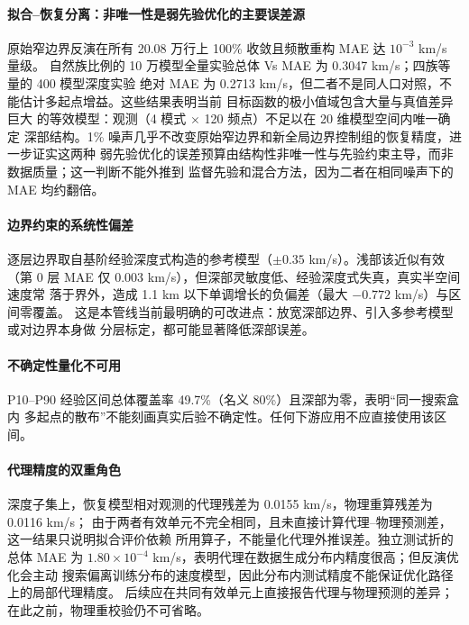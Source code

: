 \documentclass[UTF8,a4paper,11pt]{ctexart}
\begin{document}
\paragraph{拟合--恢复分离：非唯一性是弱先验优化的主要误差源}
原始窄边界反演在所有 20.08 万行上 100\% 收敛且频散重构 MAE 达 \(10^{-3}\) km/s 量级。
自然族比例的 10 万模型全量实验总体 Vs MAE 为 0.3047 km/s；四族等量的 400 模型深度实验
绝对 MAE 为 0.2713 km/s，但二者不是同人口对照，不能估计多起点增益。这些结果表明当前
目标函数的极小值域包含大量与真值差异巨大
的等效模型：观测（4 模式 \(\times\) 120 频点）不足以在 20 维模型空间内唯一确定
深部结构。1\% 噪声几乎不改变原始窄边界和新全局边界控制组的恢复精度，进一步证实这两种
弱先验优化的误差预算由结构性非唯一性与先验约束主导，而非数据质量；这一判断不能外推到
监督先验和混合方法，因为二者在相同噪声下的 MAE 均约翻倍。

\paragraph{边界约束的系统性偏差}
逐层边界取自基阶经验深度式构造的参考模型（\(\pm0.35\) km/s）。浅部该近似有效
（第 0 层 MAE 仅 0.003 km/s），但深部灵敏度低、经验深度式失真，真实半空间速度常
落于界外，造成 1.1 km 以下单调增长的负偏差（最大 \(-0.772\) km/s）与区间零覆盖。
这是本管线当前最明确的可改进点：放宽深部边界、引入多参考模型或对边界本身做
分层标定，都可能显著降低深部误差。

\paragraph{不确定性量化不可用}
P10--P90 经验区间总体覆盖率 49.7\%（名义 80\%）且深部为零，表明``同一搜索盒内
多起点的散布''不能刻画真实后验不确定性。任何下游应用不应直接使用该区间。

\paragraph{代理精度的双重角色}
深度子集上，恢复模型相对观测的代理残差为 0.0155 km/s，物理重算残差为 0.0116 km/s；
由于两者有效单元不完全相同，且未直接计算代理--物理预测差，这一结果只说明拟合评价依赖
所用算子，不能量化代理外推误差。独立测试折的总体 MAE 为
\(1.80\times10^{-4}\) km/s，表明代理在数据生成分布内精度很高；但反演优化会主动
搜索偏离训练分布的速度模型，因此分布内测试精度不能保证优化路径上的局部代理精度。
后续应在共同有效单元上直接报告代理与物理预测的差异；在此之前，物理重校验仍不可省略。
\end{document}
